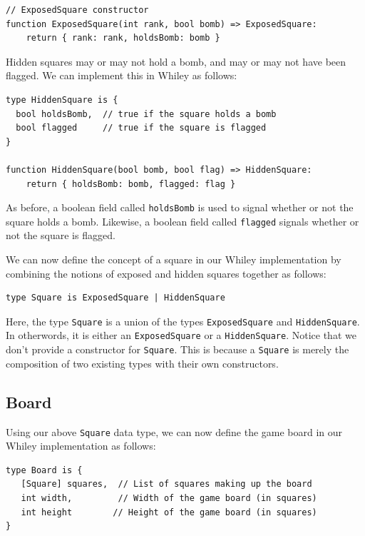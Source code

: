 \begin{lstlisting}
// ExposedSquare constructor
function ExposedSquare(int rank, bool bomb) => ExposedSquare:
    return { rank: rank, holdsBomb: bomb }
\end{lstlisting}


Hidden squares may or may not hold a bomb, and may or may not have been flagged.  We can implement this in Whiley as follows:

\begin{lstlisting}
type HiddenSquare is { 
  bool holdsBomb,  // true if the square holds a bomb
  bool flagged     // true if the square is flagged
}

function HiddenSquare(bool bomb, bool flag) => HiddenSquare:
    return { holdsBomb: bomb, flagged: flag }
\end{lstlisting}

As before, a boolean field called \lstinline{holdsBomb} is used to signal whether or not the square holds a bomb.  Likewise, a boolean field called \lstinline{flagged} signals whether or not the square is flagged.  

We can now define the concept of a square in our Whiley implementation by combining the notions of exposed and hidden squares together as follows:

\begin{lstlisting}
type Square is ExposedSquare | HiddenSquare
\end{lstlisting}

Here, the type \lstinline{Square} is a union of the types \lstinline{ExposedSquare} and \lstinline{HiddenSquare}.  In otherwords, it is either an \lstinline{ExposedSquare} or a \lstinline{HiddenSquare}.  Notice that we don't provide a constructor for \lstinline{Square}.  This is because a \lstinline{Square} is merely the composition of two existing types with their own constructors.

\subsection{Board}

Using our above \lstinline{Square} data type, we can now define the game board in our Whiley implementation as follows:

\begin{lstlisting}
type Board is {
   [Square] squares,  // List of squares making up the board
   int width,         // Width of the game board (in squares)
   int height        // Height of the game board (in squares)
}
\end{lstlisting}


